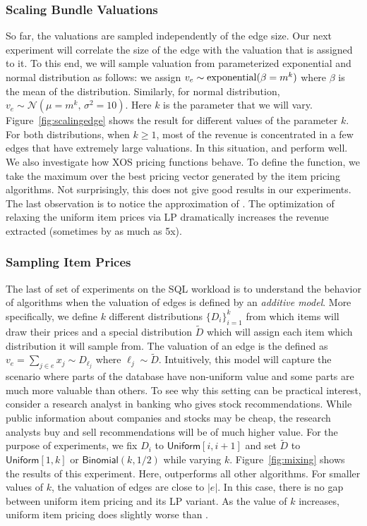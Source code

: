 \subsubsection{Scaling Bundle Valuations} So far, the valuations are sampled independently of the edge size. Our next experiment will correlate the size of the edge with the valuation that is assigned to it. To this end, we will sample valuation from parameterized exponential and normal distribution as follows: we assign $v_e \sim {\rm exponential}(\beta = m^k)$ where $\beta$ is the mean of the distribution. Similarly, for normal distribution, $v_e \sim \mathcal{N}(\mu = m^k,\, \sigma^2 = 10)$. Here $k$ is the parameter that we will vary. Figure~\ref{fig:scalingedge} shows the result for different values of the parameter $k$. For both distributions, when $k \geq 1$, most of the revenue is concentrated in a few edges that have extremely large valuations. In this situation, \lpip and \ubp perform well. We also investigate how XOS pricing functions behave. To define the function, we take the maximum over the best pricing vector generated by the item pricing algorithms. Not surprisingly, this does not give good results in our experiments. The last observation is to notice the approximation of \uip. The optimization of relaxing the uniform item prices via  LP dramatically increases the revenue extracted (sometimes by as much as 5x).

\subsubsection{Sampling Item Prices} The last of set of experiments on the SQL workload is to understand the behavior of algorithms when the valuation of edges is defined by an \emph{additive model}. More specifically, we define $k$ different distributions $\{D_i\}_{i=1}^{k}$ from which items will draw their prices and a special distribution $\tilde{D}$ which will assign each item which distribution it will sample from. The valuation of an edge is the defined as $v_e = \sum_{j \in e} x_j \sim D_{\ell_j}$ where $\ell_j \sim \tilde{D}$. Intuitively, this model will capture the scenario where parts of the database have non-uniform value and some parts are much more valuable than others. To see why this setting can be practical interest, consider a research analyst in banking who gives stock recommendations. While public information about companies and stocks may be cheap, the research analysts buy and sell recommendations will be of much higher value. For the purpose of experiments, we fix $D_i$ to $\textsf{Uniform}[i, i+1]$ and set $\tilde{D}$ to $\textsf{Uniform}[1, k]$ or $\textsf{Binomial}(k, 1/2)$ while varying $k$. Figure~\ref{fig:mixing} shows the results of this experiment. Here, \lpip outperforms all other algorithms. For smaller values of $k$, the valuation of edges are close to $|e|$. In this case, there is no gap between uniform item pricing and its LP variant. As  the value of $k$ increases, uniform item pricing does slightly worse than \lpip.


